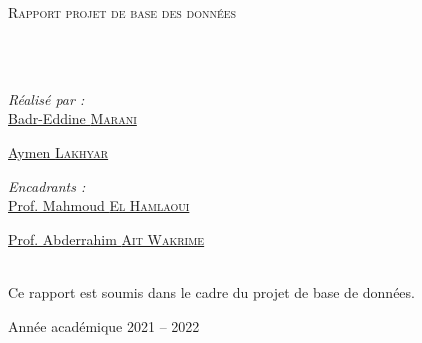 \documentclass[
	11pt,
	oneside,
	openany,
	french,
	onehalfspacing,
	liststotoc,
	toctotoc,
	parskip,
	headsepline,
	consistentlayout,
]{template}
\author{Badr-Eddine \textsc{Marani} \\ Badr-Eddine \textsc{Marani}}
\begin{document}
	\pagestyle{plain}
	\begin{titlepage}
		\begin{center}
			\vspace*{.06\textheight}
			{\scshape\LARGE \univname\par}\vspace{1.5cm}
			\textsc{\Large Rapport projet de base des données}\\[0.5cm]

			\HRule \\[0.4cm]
			{\huge \bfseries \ttitle\par}\vspace{0.4cm}
			\HRule \\[1.5cm]

			\begin{minipage}[t]{0.4\textwidth}
				\begin{flushleft} \large
					\emph{Réalisé par :}\\
					\href{mailto:badr-eddine.marani@centrale-casablanca.ma}{Badr-Eddine \textsc{Marani}}

					\href{mailto:aymen.lakhyar@centrale-casablanca.ma}{Aymen \textsc{Lakhyar}}
				\end{flushleft}
			\end{minipage}
			\begin{minipage}[t]{0.4\textwidth}
				\begin{flushright} \large
					\emph{Encadrants :} \\
					\href{}{Prof. Mahmoud \textsc{El Hamlaoui}}

					\href{}{Prof. Abderrahim \textsc{Ait Wakrime}}


				\end{flushright}
			\end{minipage}\\[3cm]


			\Large Ce rapport est soumis dans le cadre du projet de base de données.\\[0.3cm]

			\vspace*{\fill}

			{\large Année académique 2021 -- 2022}\\[4cm]
		\end{center}
	\end{titlepage}

	\tableofcontents

	\listoffigures

	\listoftables

	
	
	
	
	

	\appendix
    	
\end{document}
